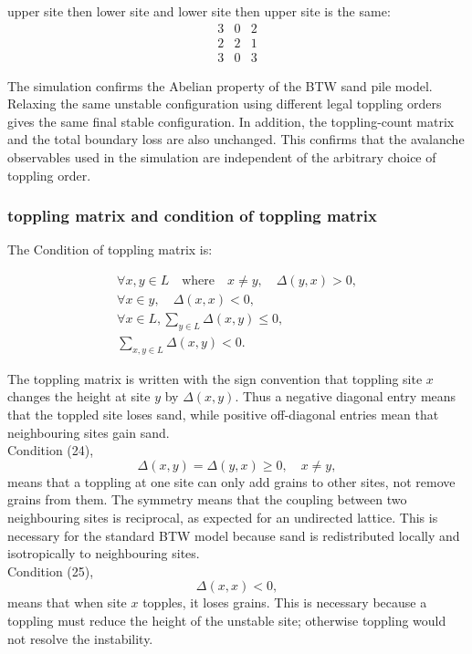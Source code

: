 \documentclass{article}
\begin{document}
upper site then lower site and lower site then upper site is the same:
\[
\begin{matrix} 
3 & 0 &2 \\
2 & 2 & 1\\
3 & 0 & 3
\end{matrix}
\]

The simulation confirms the Abelian property of the BTW sand pile model. Relaxing the same unstable configuration using different legal toppling orders gives the same final stable configuration. In addition, the toppling-count matrix and the total boundary loss are also unchanged. This confirms that the avalanche observables used in the simulation are independent of the arbitrary choice of toppling order.

\clearpage

\subsubsection{toppling matrix and condition of toppling matrix}
The Condition of toppling matrix is:

\begin{align}
    \forall x,y\in L \quad \mbox{where} \quad x \neq y , \quad \Delta (y,x) >0, \\
    \forall x \in y, \quad \Delta (x,x) < 0,\\
    \forall x \in L, \sum_{y\in L} \Delta (x,y) \leq 0, \\
    \sum_{x,y \in L} \Delta (x,y) < 0.
\end{align}

The toppling matrix is written with the sign convention that toppling site \(x\) changes the height at site \(y\) by \(\Delta(x,y)\). Thus a negative diagonal entry means that the toppled site loses sand, while positive off-diagonal entries mean that neighbouring sites gain sand.\\

Condition (24),
\[
\Delta(x,y)=\Delta(y,x)\ge 0,\quad x\ne y,
\]
means that a toppling at one site can only add grains to other sites, not remove grains from them. The symmetry means that the coupling between two neighbouring sites is reciprocal, as expected for an undirected lattice. This is necessary for the standard BTW model because sand is redistributed locally and isotropically to neighbouring sites.\\

Condition (25),
\[
\Delta(x,x)<0,
\]
means that when site \(x\) topples, it loses grains. This is necessary because a toppling must reduce the height of the unstable site; otherwise toppling would not resolve the instability. \\
\end{document}
